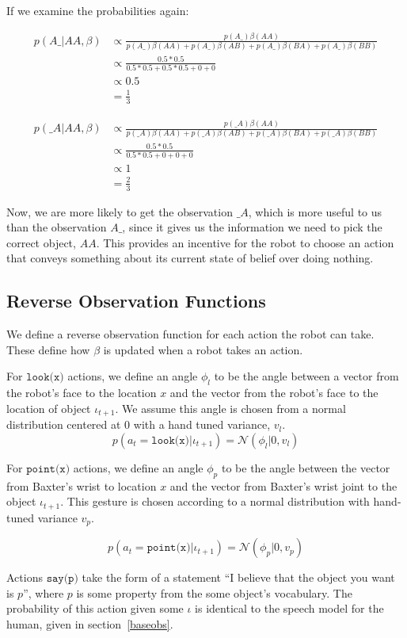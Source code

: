 \documentclass{article}
\begin{document}
If we examine the probabilities again: 

\begin{align*}
	p(A\_|AA, \beta) &\propto \frac{ p(A\_)\beta(AA) }{ p(A\_)\beta(AA) + p(A\_)\beta(AB) + p(A\_)\beta(BA) + p(A\_)\beta(BB)} \\
	&\propto \frac{0.5 * 0.5}{0.5 * 0.5 + 0.5 * 0.5 + 0 + 0} \\
	&\propto 0.5 \\
	&= \frac{1}{3}
\end{align*}

\begin{align*}
	p(\_A|AA, \beta) &\propto \frac{ p(\_A)\beta(AA) }{ p(\_A)\beta(AA) + p(\_A)\beta(AB) + p(\_A)\beta(BA) + p(\_A)\beta(BB)} \\
	&\propto \frac{0.5 * 0.5}{0.5 * 0.5 + 0 + 0 + 0} \\
	&\propto 1 \\
	&= \frac{2}{3}
\end{align*}
 
Now, we are more likely to get the observation $\_A$, which is more useful to us than the observation $A\_$, since it gives us the information we need to pick the correct object, $AA$. This provides an incentive for the robot to choose an action that conveys something about its current state of belief over doing nothing. 

\subsection{Reverse Observation Functions}

We define a reverse observation function for each action the robot can take. These define how $\beta$ is updated when a robot takes an action. 

For $\texttt{look(x)}$ actions, we define an angle $\phi_l$ to be the angle between a vector from the robot's face to the location $x$ and the vector from the robot's face to the location of object $\iota_{t+1}$. We assume this angle is chosen from a normal distribution centered at 0 with a hand tuned variance, $v_l$. 
$$p(a_{t} = \texttt{look(x)} | \iota_{t+1}) = \mathcal{N}(\phi_l | 0, v_{l})$$

For $\texttt{point(x)}$ actions, we define an angle $\phi_p$ to be the angle between the vector from Baxter's wrist to location $x$ and the vector from Baxter's wrist joint to the object $\iota_{t+1}$. This gesture is chosen according to a normal distribution with hand-tuned variance $v_p$. 

$$p(a_{t} = \texttt{point(x)} | \iota_{t+1}) = \mathcal{N}(\phi_p | 0, v_{p})$$

Actions $\texttt{say(p)}$ take the form of a statement ``I believe that the object you want is $p$'', where $p$ is some property from the some object's vocabulary. The probability of this action given some $\iota$ is identical to the speech model for the human, given in section~\ref{baseobs}. 


\end{document}
